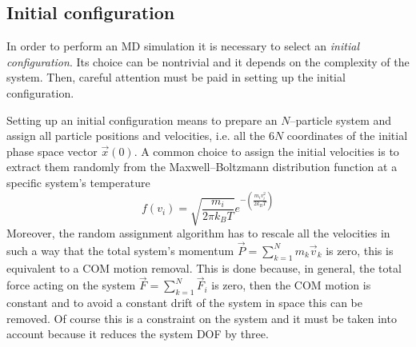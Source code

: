 \subsection{Initial configuration}
In order to perform an \ac{MD} simulation it is necessary to select an \textit{initial configuration}. Its
choice can be nontrivial and it depends on the complexity of the system. Then, careful attention must be paid in
setting up the initial configuration.

Setting up an initial configuration means to prepare an $N$--particle system and assign all particle positions
and velocities, i.e. all the $6N$ coordinates of the initial phase space vector $\vec x(0)$. A common choice to
assign the initial velocities is to extract them randomly from the Maxwell--Boltzmann distribution function at a
specific system's temperature
\begin{equation*}
	f(v_i) = \sqrt{\frac{m_i}{2\pi k_B T}}e^{-\left ( \frac{m_iv_i^2}{2k_B T}\right )}
\end{equation*}
Moreover, the random assignment algorithm has to rescale all the velocities in such a way that the total system's
momentum $\vec P = \sum_{k=1}^N m_k\vec v_k$ is zero, this is equivalent to a \ac{COM} motion removal. This is
done because, in general, the total force acting on the system $\vec F = \sum_{k=1}^N \vec F_i$ is zero, then the
\ac{COM} motion is constant and to avoid a constant drift of the system in space this can be removed. Of course
this is a constraint on the system and it must be taken into account because it reduces the system \ac{DOF} by
three.

